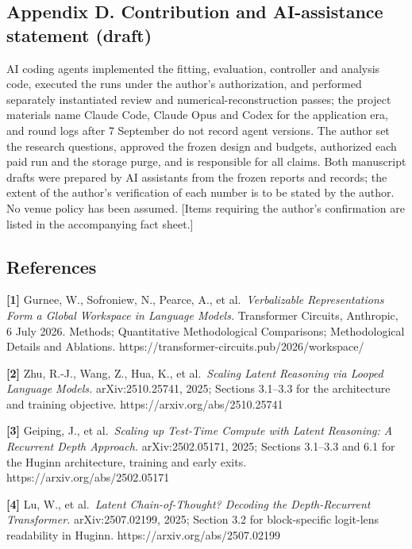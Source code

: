 \documentclass[
  british,
  11pt,
  a4paper,
]{article}
\begin{document}
\subsection{Appendix D. Contribution and AI-assistance statement
(draft)}\label{appendix-d.-contribution-and-ai-assistance-statement-draft}

AI coding agents implemented the fitting, evaluation, controller and
analysis code, executed the runs under the author's authorization, and
performed separately instantiated review and numerical-reconstruction
passes; the project materials name Claude Code, Claude Opus and Codex
for the application era, and round logs after 7 September do not record
agent versions. The author set the research questions, approved the
frozen design and budgets, authorized each paid run and the storage
purge, and is responsible for all claims. Both manuscript drafts were
prepared by AI assistants from the frozen reports and records; the
extent of the author's verification of each number is to be stated by
the author. No venue policy has been assumed. {[}Items requiring the
author's confirmation are listed in the accompanying fact sheet.{]}

\subsection{References}\label{references}

\textbf{{[}1{]}} Gurnee, W., Sofroniew, N., Pearce, A., et
al.~\emph{Verbalizable Representations Form a Global Workspace in
Language Models.} Transformer Circuits, Anthropic, 6 July 2026. Methods;
Quantitative Methodological Comparisons; Methodological Details and
Ablations. https://transformer-circuits.pub/2026/workspace/

\textbf{{[}2{]}} Zhu, R.-J., Wang, Z., Hua, K., et al.~\emph{Scaling
Latent Reasoning via Looped Language Models.} arXiv:2510.25741, 2025;
Sections 3.1--3.3 for the architecture and training objective.
https://arxiv.org/abs/2510.25741

\textbf{{[}3{]}} Geiping, J., et al.~\emph{Scaling up Test-Time Compute
with Latent Reasoning: A Recurrent Depth Approach.} arXiv:2502.05171,
2025; Sections 3.1--3.3 and 6.1 for the Huginn architecture, training
and early exits. https://arxiv.org/abs/2502.05171

\textbf{{[}4{]}} Lu, W., et al.~\emph{Latent Chain-of-Thought? Decoding
the Depth-Recurrent Transformer.} arXiv:2507.02199, 2025; Section 3.2
for block-specific logit-lens readability in Huginn.
https://arxiv.org/abs/2507.02199
\end{document}
